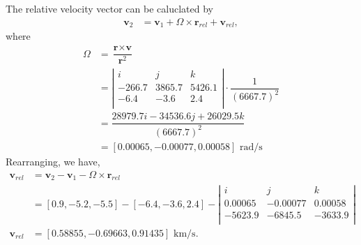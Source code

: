 \documentclass[onecolumn,10pt]{jhwhw}
\begin{document}
The relative velocity vector can be caluclated by
\begin{align*}
\textbf{v}_{2} &= \textbf{v}_1 + \textbf{$\Omega$} \times \textbf{r}_{rel} + \textbf{v}_{rel},
\end{align*}
where
\begin{align*}
\textbf{$\Omega$} &= \dfrac{\textbf{r} \times \textbf{v}}{\textbf{r}^2} \\
 &= \left|
 \begin{array}{ccc}
 i & j & k \\
 -266.7 & 3865.7 & 5426.1 \\
 -6.4 & -3.6 &  2.4 \\
 \end{array}
 \right| \cdot \dfrac{1}{(6667.7)^2} \\
 &= \dfrac{28979.7i -34536.6j + 26029.5k}{(6667.7)^2} \\
 &= [ 0.00065, -0.00077,  0.00058] \mbox{ rad/s}
\end{align*}
Rearranging, we have,
\begin{align*}
\textbf{v}_{rel} &= \textbf{v}_{2} - \textbf{v}_1 - \textbf{$\Omega$} \times \textbf{r}_{rel} \\
\phantom{\textbf{v}_{rel}} &= [0.9, -5.2, -5.5] - [-6.4, -3.6, 2.4] - \left|
 \begin{array}{ccc}
 i & j & k \\
 0.00065 & -0.00077 & 0.00058 \\
 -5623.9 &  -6845.5 & -3633.9 \\
 \end{array}
 \right| \\
\textbf{v}_{rel} &= [0.58855, -0.69663,  0.91435] \mbox{ km/s}.
\end{align*}

\clearpage
\end{document}

